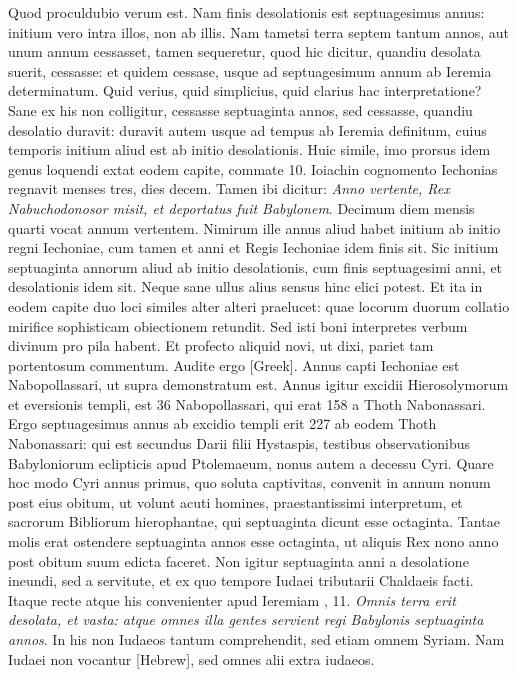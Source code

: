 Quod
proculdubio verum est.
Nam finis desolationis est septuagesimus
annus: initium vero intra illos, non ab illis.
Nam tametsi terra septem
tantum annos, aut unum annum cessasset, tamen sequeretur,
quod hic dicitur, quandiu desolata suerit, cessasse: et quidem cessase,
usque ad septuagesimum annum ab Ieremia determinatum.
Quid verius, quid simplicius, quid clarius hac interpretatione?
Sane
ex his non colligitur, cessasse septuaginta annos, sed cessasse,
quandiu desolatio duravit: duravit autem usque ad tempus ab Ieremia
definitum, cuius temporis initium aliud est ab initio desolationis.
Huic simile, imo prorsus idem genus loquendi extat eodem capite,
commate 10.
Ioiachin cognomento Iechonias regnavit menses tres,
dies decem.
Tamen ibi dicitur: \textit{Anno vertente, Rex Nabuchodonosor
misit, et deportatus fuit Babylonem}.
Decimum diem mensis quarti
vocat annum vertentem.
Nimirum ille annus aliud habet initium
ab initio regni Iechoniae, cum tamen et anni et Regis Iechoniae
idem finis sit.
Sic initium septuaginta annorum aliud ab initio desolationis,
cum finis septuagesimi anni, et desolationis idem sit.
Neque sane ullus alius sensus hinc elici potest.
Et ita in eodem capite
duo loci similes alter alteri praelucet: quae locorum duorum
collatio mirifice sophisticam obiectionem retundit.
Sed isti boni
interpretes verbum divinum pro pila habent.
Et profecto aliquid
novi, ut dixi, pariet tam portentosum commentum.
Audite
ergo \textgreek{[Greek]}.
Annus capti Iechoniae est  Nabopollassari,
ut supra demonstratum est.
Annus igitur excidii Hierosolymorum
et eversionis templi, est 36 Nabopollassari, qui erat 158 a
Thoth Nabonassari.
Ergo septuagesimus annus ab excidio templi
erit 227 ab eodem Thoth Nabonassari: qui est secundus Darii filii
Hystaspis, testibus observationibus Babyloniorum eclipticis apud
Ptolemaeum, nonus autem a decessu Cyri.
Quare hoc modo
Cyri annus primus, quo soluta captivitas, convenit in annum
nonum post eius obitum, ut volunt acuti homines, praestantissimi
interpretum, et sacrorum Bibliorum hierophantae, qui septuaginta
dicunt esse octaginta.
Tantae molis erat ostendere septuaginta
annos esse octaginta, ut aliquis Rex nono anno post obitum
suum edicta faceret.
Non igitur septuaginta anni a desolatione
ineundi, sed a servitute, et ex quo tempore Iudaei tributarii
Chaldaeis facti.
Itaque recte atque his convenienter apud Ieremiam
, 11.
\textit{Omnis terra erit desolata, et vasta: atque omnes
illa gentes servient regi Babylonis septuaginta annos}.
In his non Iudaeos
tantum comprehendit, sed etiam omnem Syriam.
Nam Iudaei
non vocantur \texthebrew{[Hebrew]}, sed omnes alii extra iudaeos.

